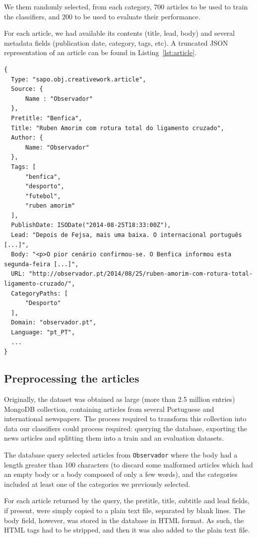 \documentclass[conference]{IEEEtran}
\begin{document}
We them randomly selected, from each category, 700 articles to be used
to train the classifiers, and 200 to be used to evaluate their
performance.

For each article, we had available its contents (title, lead, body)
and several metadata fields (publication date, category, tags, etc). A
truncated JSON representation of an article can be found in
Listing~\ref{lst:article}.

\begin{lstlisting}[caption={Example of JSON representation of an article},label={lst:article}, extendedchars=true]
{
  Type: "sapo.obj.creativework.article",
  Source: {
      Name : "Observador"
  },
  Pretitle: "Benfica",
  Title: "Ruben Amorim com rotura total do ligamento cruzado",
  Author: {
      Name: "Observador"
  },
  Tags: [
      "benfica",
      "desporto",
      "futebol",
      "ruben amorim"
  ],
  PublishDate: ISODate("2014-08-25T18:33:00Z"),
  Lead: "Depois de Fejsa, mais uma baixa. O internacional português [...]",
  Body: "<p>O pior cenário confirmou-se. O Benfica informou esta segunda-feira [...]",
  URL: "http://observador.pt/2014/08/25/ruben-amorim-com-rotura-total-ligamento-cruzado/",
  CategoryPaths: [
      "Desporto"
  ],
  Domain: "observador.pt",
  Language: "pt_PT",
  ...
}
\end{lstlisting}

\subsection{Preprocessing the articles}

Originally, the dataset was obtained as large (more than 2.5 million
entries) MongoDB collection, containing articles from several
Portuguese and international newspapers. The process required to
transform this collection into data our classifiers could process
required: querying the database, exporting the news articles and
splitting them into a train and an evaluation datasets.

The database query selected articles from \texttt{Observador} where
the body had a length greater than 100 characters (to
discard some malformed articles which had an empty body or a body
composed of only a few words), and the categories included at least
one of the categories we previously selected.

For each article returned by the query, the pretitle, title, subtitle
and lead fields, if present, were simply copied to a plain text file,
separated by blank lines. The body field, however, was stored in the
database in HTML format. As such, the HTML tags had to be stripped,
and then it was also added to the plain text file.
\end{document}
